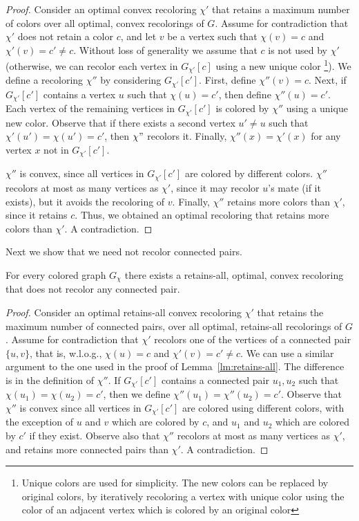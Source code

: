 \begin{proof}
Consider an optimal convex recoloring $\chi'$ that retains a maximum
number of colors over all optimal, 
convex recolorings of $G$.
%
Assume for contradiction that $\chi'$ does not retain a color $c$, 
and let $v$ be a vertex such that $\chi(v) = c$ and $\chi'(v) = c' \neq c$.
%
Without loss of generality we assume that $c$ is not used by $\chi'$ 
(otherwise, we can recolor each vertex in $G_{\chi'}[c]$ using a new unique color%
\footnote{
Unique colors are used for simplicity. 
The new colors can be replaced by original colors, 
by iteratively recoloring a vertex with unique color 
using the color of an adjacent vertex which is colored by an original color
}).
%
We define a recoloring $\chi''$ by considering $G_{\chi'}[c']$.
%
First, 
define $\chi''(v) = c$.
Next, 
if $G_{\chi'}[c']$ contains a vertex $u$ such that $\chi(u) = c'$, 
then define $\chi''(u) = c'$.
%
Each vertex of the remaining vertices in $G_{\chi'}[c']$ is colored by $\chi''$ 
using a unique new color.
%
Observe that if there exists a second vertex 
$u' \neq u$ such that $\chi'(u') = \chi(u') = c'$, 
then $\chi"$ recolors it.
%
Finally, 
$\chi''(x) = \chi'(x)$ for any vertex $x$ not in $G_{\chi'}[c']$.

$\chi''$ is convex, 
since all vertices in $G_{\chi'}[c']$ are colored by different colors. 
%
$\chi''$ recolors at most as many vertices as $\chi'$, 
since it may recolor $u$'s mate (if it exists), 
but it avoids the recoloring of $v$. 
%
Finally, 
$\chi''$ retains more colors than $\chi'$, 
since it retains $c$.
%
Thus, 
we obtained an optimal recoloring that retains more colors than $\chi'$.  
%
A contradiction.
{}\end{proof}

Next we show that we need not recolor connected pairs.

\begin{lemma}
\label{lm:does_not_recolor_connected_pair}
For every colored graph $G_\chi$ there exists a retains-all,
optimal,
convex recoloring that does not recolor any connected pair.
\end{lemma}

\begin{proof}
Consider an optimal retains-all convex recoloring $\chi'$ 
that retains the maximum number of connected pairs, 
over all optimal, 
retains-all recolorings of $G$.  
%
Assume for contradiction that $\chi'$ 
recolors one of the vertices of a connected pair $\{u, v\}$, 
that is, 
w.l.o.g., 
$\chi(u) = c$ and $\chi'(v) = c' \neq c$.
%
We can use a similar argument to the one used in the proof of Lemma~\ref{lm:retains-all}.
%
The difference is in the definition of $\chi''$.  
%
If $G_{\chi'}[c']$ contains a connected pair $u_1, u_2$ 
such that $\chi(u_1) = \chi(u_2) = c'$, 
then we define $\chi''(u_1) = \chi''(u_2) = c'$.
%
Observe that $\chi''$ is convex since all vertices in $G_{\chi'}[c']$
are colored using different colors,
with the exception of $u$ and $v$ which are colored by $c$,
and $u_1$ and $u_2$ which are colored by $c'$ if they exist. 
%
Observe also that $\chi''$ recolors at most as many vertices as $\chi'$, 
and retains more connected pairs than $\chi'$. 
%
A contradiction.
{}\end{proof}

